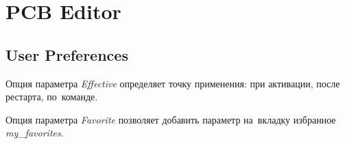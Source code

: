 \section{PCB Editor} \label{sec:pcb_editor}

\subsection{User Preferences} \label{ssec:user_preferences}

Опция параметра \textit{Effective} определяет точку применения: при активации, после рестарта, по~команде.

Опция параметра \textit{Favorite} позволяет добавить параметр на~вкладку избранное \textit{my\_favorites}.


